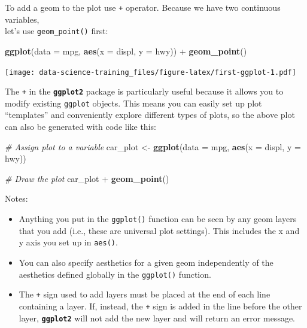 \documentclass[]{book}
\newenvironment{Shaded}{\begin{snugshade}}{\end{snugshade}}
\newcommand{\KeywordTok}[1]{\textcolor[rgb]{0.13,0.29,0.53}{\textbf{{#1}}}}
\newcommand{\DataTypeTok}[1]{\textcolor[rgb]{0.13,0.29,0.53}{{#1}}}
\newcommand{\StringTok}[1]{\textcolor[rgb]{0.31,0.60,0.02}{{#1}}}
\newcommand{\CommentTok}[1]{\textcolor[rgb]{0.56,0.35,0.01}{\textit{{#1}}}}
\newcommand{\NormalTok}[1]{{#1}}
\providecommand{\tightlist}{%
  \setlength{\itemsep}{0pt}\setlength{\parskip}{0pt}}
\theoremstyle{definition}
\theoremstyle{definition}
\theoremstyle{definition}
\theoremstyle{remark}
\begin{document}
To add a geom to the plot use \texttt{+} operator. Because we have two
continuous variables,\\
let's use \texttt{geom\_point()} first:

\begin{Shaded}
\begin{Highlighting}[]
\KeywordTok{ggplot}\NormalTok{(}\DataTypeTok{data =} \NormalTok{mpg, }\KeywordTok{aes}\NormalTok{(}\DataTypeTok{x =} \NormalTok{displ, }\DataTypeTok{y =} \NormalTok{hwy)) +}\StringTok{ }
\StringTok{  }\KeywordTok{geom_point}\NormalTok{()}
\end{Highlighting}
\end{Shaded}

\texttt{[image: data-science-training\_files/figure-latex/first-ggplot-1.pdf]}

The \texttt{+} in the \textbf{\texttt{ggplot2}} package is particularly
useful because it allows you to modify existing \texttt{ggplot} objects.
This means you can easily set up plot ``templates'' and conveniently
explore different types of plots, so the above plot can also be
generated with code like this:

\begin{Shaded}
\begin{Highlighting}[]
\CommentTok{# Assign plot to a variable}
\NormalTok{car_plot <-}\StringTok{ }\KeywordTok{ggplot}\NormalTok{(}\DataTypeTok{data =} \NormalTok{mpg, }\KeywordTok{aes}\NormalTok{(}\DataTypeTok{x =} \NormalTok{displ, }\DataTypeTok{y =} \NormalTok{hwy))}

\CommentTok{# Draw the plot}
\NormalTok{car_plot +}\StringTok{ }
\StringTok{    }\KeywordTok{geom_point}\NormalTok{()}
\end{Highlighting}
\end{Shaded}

Notes:

\begin{itemize}
\tightlist
\item
  Anything you put in the \texttt{ggplot()} function can be seen by any
  geom layers that you add (i.e., these are universal plot settings).
  This includes the x and y axis you set up in \texttt{aes()}.
\item
  You can also specify aesthetics for a given geom independently of the
  aesthetics defined globally in the \texttt{ggplot()} function.
\item
  The \texttt{+} sign used to add layers must be placed at the end of
  each line containing a layer. If, instead, the \texttt{+} sign is
  added in the line before the other layer, \textbf{\texttt{ggplot2}}
  will not add the new layer and will return an error message.
\end{itemize}
\end{document}
